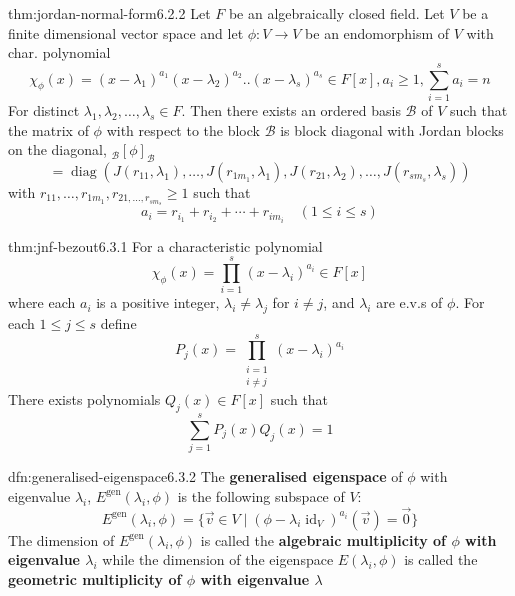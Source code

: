 \documentclass[landscape, 8pt]{extarticle}
\DeclareMathOperator{\id}{id}
\DeclareMathOperator{\diag}{diag}
\begin{document}
\begin{multicols}{3}
\vspace{-5pt}
\begin{thm}{thm:jordan-normal-form}{6.2.2}
    \vspace{-5pt}
    Let $F$ be an algebraically closed field. Let $V$ be a finite dimensional vector space and let $\phi : V \to V$ be an endomorphism of $V$ with char. polynomial
    \vspace{-5pt}
    \[\chi_{\phi}(x) = (x - \lambda_{1})^{a_{1}}(x - \lambda_{2})^{a_{2}} . . (x - \lambda_{s})^{a_{s}}\in F[x], a_{i} \ge 1, \sum_{i = 1}^{s} a_{i} = n\]
    For distinct $\lambda_{1},\lambda_{2},\dots,\lambda_{s}\in F$. Then there exists an ordered basis $\mathcal{B}$ of $V$ such that the matrix of $\phi$ with respect to the block $\mathcal{B}$ is block diagonal with Jordan blocks on the diagonal, ${}_{\mathcal{B}}[\phi]_{\mathcal{B}}$
    \[ = \diag(J(r_{11}, \lambda_{1}),\dots,J(r_{1m_{1}}, \lambda_{1}), J(r_{21}, \lambda_{2}),\dots,J(r_{sm_{s}}, \lambda_{s}))\]
    with $r_{11},\dots,r_{1m_{1}}, r_{21,\dots,r_{sm_{s}}} \ge 1$ such that
    \[a_{i} = r_{i_{1}} + r_{i_{2}} + \cdots + r_{im_{i}} \quad (1 \le i \le s)\]
\end{thm}

\begin{thm}{thm:jnf-bezout}{6.3.1}
    For a characteristic polynomial
    \[\chi_{\phi}(x) = \prod_{i = 1}^{s} (x - \lambda_{i})^{a_{i}}\in F[x]\]
    where each $a_{i}$ is a positive integer, $\lambda_{i} \ne \lambda_{j}$ for $i\ne j$, and $\lambda_{i}$ are e.v.s of $\phi$. For each $1\le j \le s$ define
    \[P_{j}(x) = \prod_{\substack{i = 1 \\ i \ne j}}^{s} (x - \lambda_{i})^{a_{i}}\]
    There exists polynomials $Q_{j}(x)\in F[x]$ such that
    \[\sum_{j = 1}^{s} P_{j}(x)Q_{j}(x) = 1\]
\end{thm}

\begin{dfn}{dfn:generalised-eigenspace}{6.3.2}
    The \textbf{generalised eigenspace} of $\phi$ with eigenvalue $\lambda_{i}$, $E^{\text{gen}}(\lambda_{i}, \phi)$ is the following subspace of $V$:
    \[E^{\text{gen}}(\lambda_{i}, \phi) = \{\vec{v}\in V \mid (\phi - \lambda_{i} \id_{V})^{a_{i}} (\vec{v}) = \vec{0}\}\]
    The dimension of $E^{\text{gen}}(\lambda_{i}, \phi)$ is called the \textbf{algebraic multiplicity of $\phi$ with eigenvalue $\lambda_{i}$} while the dimension of the eigenspace $E(\lambda_{i}, \phi)$ is called the \textbf{geometric multiplicity of $\phi$ with eigenvalue $\lambda$}


\end{dfn}
\end{multicols}
\end{document}
